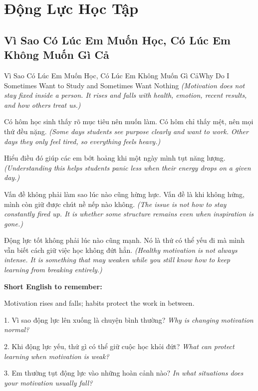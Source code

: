 \chapter{Động Lực Học Tập}

\section{Vì Sao Có Lúc Em Muốn Học, Có Lúc Em Không Muốn Gì Cả}
\begin{truyen}{Vì Sao Có Lúc Em Muốn Học, Có Lúc Em Không Muốn Gì Cả}{Why Do I Sometimes Want to Study and Sometimes Want Nothing}
\textit{(Motivation does not stay fixed inside a person. It rises and falls with health, emotion, recent results, and how others treat us.)}

Có hôm học sinh thấy rõ mục tiêu nên muốn làm. Có hôm chỉ thấy mệt, nên mọi thứ đều nặng.
\textit{(Some days students see purpose clearly and want to work. Other days they only feel tired, so everything feels heavy.)}

Hiểu điều đó giúp các em bớt hoảng khi một ngày mình tụt năng lượng.
\textit{(Understanding this helps students panic less when their energy drops on a given day.)}

Vấn đề không phải làm sao lúc nào cũng hừng hực. Vấn đề là khi không hứng, mình còn giữ được chút nề nếp nào không.
\textit{(The issue is not how to stay constantly fired up. It is whether some structure remains even when inspiration is gone.)}
\end{truyen}

\begin{baihoc}
Động lực tốt không phải lúc nào cũng mạnh. Nó là thứ có thể yếu đi mà mình vẫn biết cách giữ việc học không đứt hẳn.
\textit{(Healthy motivation is not always intense. It is something that may weaken while you still know how to keep learning from breaking entirely.)}
\end{baihoc}

\begin{ghinhoanh}
\textbf{Short English to remember:}

Motivation rises and falls; habits protect the work in between.

\end{ghinhoanh}

\begin{tuhocnhanh}
1. Vì sao động lực lên xuống là chuyện bình thường? \textit{Why is changing motivation normal?}

2. Khi động lực yếu, thứ gì có thể giữ cuộc học khỏi đứt? \textit{What can protect learning when motivation is weak?}

3. Em thường tụt động lực vào những hoàn cảnh nào? \textit{In what situations does your motivation usually fall?}
\end{tuhocnhanh}
\ngancach

